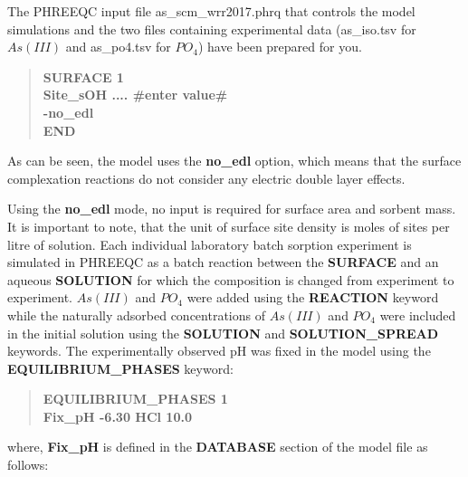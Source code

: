 The PHREEQC input file {\color{red}as\_scm\_wrr2017.phrq} that controls the model simulations 
and the two files containing experimental data ({\color{red}as\_iso.tsv for $As(III)$} 
and {\color{red}as\_po4.tsv} for $PO_4$)
have been prepared for you. \\

\begin{quote}
{\color{blue}\textbf{SURFACE 1}} \\
{\color{blue}\textbf{Site\_sOH .... \#enter value\#}}\\ 
{\color{blue}\textbf{-no\_edl}}\\
{\color{blue}\textbf{END}}\
\end{quote}

As can be seen, the model uses the {\color{blue}\textbf{no\_edl}} 
option, which means that the surface complexation reactions
do not consider any electric double layer effects.


Using the {\color{blue}\textbf{no\_edl}} mode, no input is required for surface area and sorbent mass. 
It is important to note, that the unit of surface site density is moles of sites per litre of solution.
Each individual laboratory batch sorption experiment is simulated in PHREEQC 
as a batch reaction between the {\color{blue}\textbf{SURFACE}} and an aqueous 
{\color{blue}\textbf{SOLUTION}} for which the composition is changed
from experiment to experiment. $As(III)$ and $PO_4$ were added 
using the {\color{blue}\textbf{REACTION}} keyword while the naturally 
adsorbed concentrations of $As(III)$ and $PO_4$ were included in the initial 
solution using the {\color{blue}\textbf{SOLUTION}} and 
{\color{blue}\textbf{SOLUTION\_SPREAD}} keywords. 
The experimentally observed pH was fixed in the model 
using the {\color{blue}\textbf{EQUILIBRIUM\_PHASES}} keyword:\\

\begin{quote}
{\color{blue}\textbf{EQUILIBRIUM\_PHASES 1}} \\
{\color{blue}\textbf{Fix\_pH -6.30 HCl 10.0 }}\\
\end{quote}

where, {\color{blue}\textbf{Fix\_pH}} is defined in the {\color{blue}\textbf{DATABASE}} 
section of the model file as follows:\\


